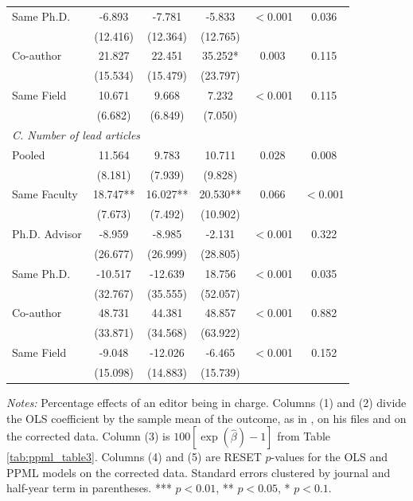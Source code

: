 \begin{table}[!htbp]
\begin{tabular*}{\linewidth}{@{\extracolsep{\fill}}lccccc}
\quad Same Ph.D. & -6.893 & -7.781 & -5.833 & $<$0.001 & 0.036 \\
 & (12.416) & (12.364) & (12.765) & & \\
\quad Co-author & 21.827 & 22.451 & 35.252* & 0.003 & 0.115 \\
 & (15.534) & (15.479) & (23.797) & & \\
\quad Same Field & 10.671 & 9.668 & 7.232 & $<$0.001 & 0.115 \\
 & (6.682) & (6.849) & (7.050) & & \\[8pt]
\multicolumn{6}{l}{\textit{C. Number of lead articles}} \\[2pt]
\quad Pooled & 11.564 & 9.783 & 10.711 & 0.028 & 0.008 \\
 & (8.181) & (7.939) & (9.828) & & \\
\quad Same Faculty & 18.747** & 16.027** & 20.530** & 0.066 & $<$0.001 \\
 & (7.673) & (7.492) & (10.902) & & \\
\quad Ph.D. Advisor & -8.959 & -8.985 & -2.131 & $<$0.001 & 0.322 \\
 & (26.677) & (26.999) & (28.805) & & \\
\quad Same Ph.D. & -10.517 & -12.639 & 18.756 & $<$0.001 & 0.035 \\
 & (32.767) & (35.555) & (52.057) & & \\
\quad Co-author & 48.731 & 44.381 & 48.857 & $<$0.001 & 0.882 \\
 & (33.871) & (34.568) & (63.922) & & \\
\quad Same Field & -9.048 & -12.026 & -6.465 & $<$0.001 & 0.152 \\
 & (15.098) & (14.883) & (15.739) & & \\
\bottomrule
\end{tabular*}
\begin{minipage}{\linewidth}
\vspace{4pt}
\footnotesize\textit{Notes:} Percentage effects of an editor being in charge. Columns (1) and (2) divide the OLS coefficient by the sample mean of the outcome, as in \citet{Colussi2018}, on his files and on the corrected data. Column (3) is $100[\exp(\hat\beta)-1]$ from Table \ref{tab:ppml_table3}. Columns (4) and (5) are RESET $p$-values for the OLS and PPML models on the corrected data. Standard errors clustered by journal and half-year term in parentheses. *** $p<0.01$, ** $p<0.05$, * $p<0.1$.
\end{minipage}
\end{table}